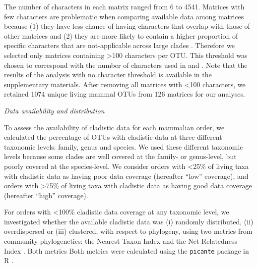 \documentclass[12pt,letterpaper]{article}
\renewcommand{\subsection}[1]{%
\bigskip
\begin{center}
\begin{large}
\normalfont\itshape #1
\end{large}
\end{center}}
\begin{document}
The number of characters in each matrix ranged from 6 to 4541.
Matrices with few characters are problematic when comparing available data among matrices because (1) they have less chance of having characters that overlap with those of other matrices \citep{wagner2000} and (2) they are more likely to contain a higher proportion of specific characters that are not-applicable across large clades \citep[][e.g. ``antler ramifications'' is a character that is only applicable to Cervidae not all mammals]{Brazeau2011}.
Therefore we selected only matrices containing \textgreater 100 characters per OTU.
This threshold was chosen to correspond with the number of characters used in \citet{GuillermeCooper} and \citet{harrisonamong-character2014}.
Note that the results of the analysis with no character threshold is available in the supplementary materials.
After removing all matrices with \textless 100 characters, we retained 1074 unique living mammal OTUs from 126 matrices for our analyses. %

\subsection{Data availability and distribution}
To assess the availability of cladistic data for each mammalian order, we calculated the percentage of OTUs with cladistic data at three different taxonomic levels: family, genus and species.
We used these different taxonomic levels because some clades are well covered at the family- or genus-level, but poorly covered at the species-level.
We consider orders with \textless 25\% of living taxa with cladistic data as having poor data coverage (hereafter ``low'' coverage), and orders with \textgreater 75\% of living taxa with cladistic data as having good data coverage (hereafter ``high'' coverage). 

For orders with \textless 100\% cladistic data coverage at any taxonomic level, we investigated whether the available cladistic data was (i) randomly distributed, (ii) overdispersed or (iii) clustered, with respect to phylogeny, using two metrics from community phylogenetics: the Nearest Taxon Index \citep[NTI;][]{webb2002phylogenies} and the Net Relatedness Index \citep[NRI;][]{webb2002phylogenies}. 
Both metrics 
Both metrics were calculated using the \texttt{picante} package in R \citep{picante,R}.
\end{document}
